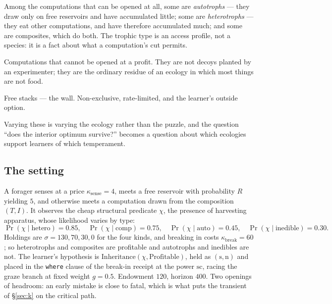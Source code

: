 \documentclass[11pt,a4paper]{article}
\theoremstyle{plain}
\theoremstyle{definition}
\theoremstyle{remark}
\newcommand{\str}{\mathrm{s}}
\newcommand{\conf}{\mathrm{c}}
\newcommand{\ev}{\mathrm{n}}
\begin{document}
\begin{description}[leftmargin=1.6em,itemsep=2pt]
\item[(T) the distribution over trophic types.] Among the computations that can
be opened at all, some are \emph{autotrophs} --- they draw only on free reservoirs
and have accumulated little; some are \emph{heterotrophs} --- they eat other
computations, and have therefore accumulated much; and some are composites, which
do both. The trophic type is an access profile, not a species: it is a fact about
what a computation's cut permits.
\item[(I) the distribution over inedibles.] Computations that cannot be opened at
a profit. They are not decoys planted by an experimenter; they are the ordinary
residue of an ecology in which most things are not food.
\item[(R) the distribution over token reservoirs housed in no trophic type.] Free
stacks --- the wall. Non-exclusive, rate-limited, and the learner's outside
option.
\end{description}

Varying these is varying the ecology rather than the puzzle, and the question
``does the interior optimum survive?'' becomes a question about which ecologies
support learners of which temperament.

\subsection{The setting}

A forager senses at a price $\kappa_{\mathrm{sense}} = 4$, meets a free reservoir
with probability $R$ yielding $5$, and otherwise meets a computation drawn from
the composition $(T, I)$. It observes the cheap structural predicate $\chi$, the
presence of harvesting apparatus, whose likelihood varies by type:
\[
\Pr(\chi \mid \text{hetero}) = 0.85,\quad
\Pr(\chi \mid \text{comp}) = 0.75,\quad
\Pr(\chi \mid \text{auto}) = 0.45,\quad
\Pr(\chi \mid \text{inedible}) = 0.30 .
\]
Holdings are $\sigma = 130, 70, 30, 0$ for the four kinds, and breaking in costs
$\kappa_{\mathrm{break}} = 60$; so heterotrophs and composites are profitable and
autotrophs and inedibles are not. The learner's hypothesis is
$\mathrm{Inheritance}(\chi, \mathrm{Profitable})$, held as $(\str,\ev)$ and
placed in the \texttt{where} clause of the break-in receipt at the power
$\str\conf$, racing the graze branch at fixed weight $g = 0.5$. Endowment $120$,
horizon $400$. Two openings of headroom: an early mistake is close to fatal,
which is what puts the transient of \S\ref{sec:k} on the critical path.
\end{document}
